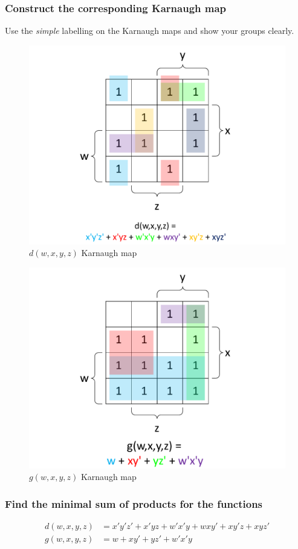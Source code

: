 \documentclass[12pt,a4paper]{article}
\begin{document}
\newpage
\subsubsection{Construct the corresponding Karnaugh map}
Use the \emph{simple} labelling on the Karnaugh maps and show your groups clearly.

\begin{figure}[h]
\centering
\caption{$d(w,x,y,z)$ Karnaugh map}
\includegraphics[scale=0.56]{./../img/q5-2_d.pdf}
\end{figure}

\begin{figure}[h]
\centering
\caption{$g(w,x,y,z)$ Karnaugh map}
\includegraphics[scale=0.56]{./../img/q5-2_g.pdf}
\end{figure}

\subsubsection{Find the minimal sum of products for the functions}
\begin{align*}
d(w,x,y,z) &= x'y'z' + x'yz + w'x'y + wxy' + xy'z + xyz' \\
g(w,x,y,z) &= w + xy' + yz' + w'x'y
\end{align*}
\end{document}

